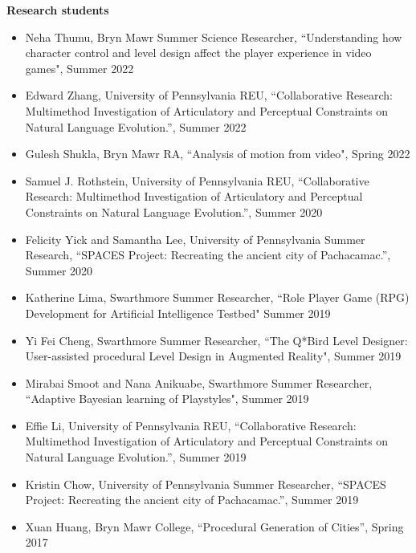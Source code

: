 {\bf Research students} 
\vspace{-1.0em}

\begin{itemize}[leftmargin=*,label={}]
\item Neha Thumu, Bryn Mawr Summer Science Researcher, ``Understanding how character control and level design affect the player experience in video games", Summer 2022
\item Edward Zhang, University of Pennsylvania REU, ``Collaborative Research: Multimethod Investigation of Articulatory and Perceptual Constraints on Natural Language Evolution.'', Summer 2022 
\item Gulesh Shukla, Bryn Mawr RA, ``Analysis of motion from video", Spring 2022
\item Samuel J. Rothstein, University of Pennsylvania REU, ``Collaborative Research: Multimethod Investigation of Articulatory and Perceptual Constraints on Natural Language Evolution.'', Summer 2020 
\item Felicity Yick and Samantha Lee, University of Pennsylvania Summer Research, ``SPACES Project: Recreating the ancient city of Pachacamac.'', Summer 2020 
\item Katherine Lima, Swarthmore Summer Researcher, ``Role Player Game (RPG) Development for Artificial Intelligence Testbed" Summer 2019
\item Yi Fei Cheng, Swarthmore Summer Researcher, ``The Q*Bird Level Designer: User-assisted procedural Level Design in Augmented Reality", Summer 2019
\item Mirabai Smoot and Nana Anikuabe, Swarthmore Summer Researcher, ``Adaptive Bayesian learning of Playstyles", Summer 2019 
\item Effie Li, University of Pennsylvania REU, ``Collaborative Research: Multimethod Investigation of Articulatory and Perceptual Constraints on Natural Language Evolution.'', Summer 2019 
\item Kristin Chow, University of Pennsylvania Summer Researcher, ``SPACES Project: Recreating the ancient city of Pachacamac.'', Summer 2019 
\item Xuan Huang, Bryn Mawr College, ``Procedural Generation of Cities'', Spring 2017
\end{itemize}


